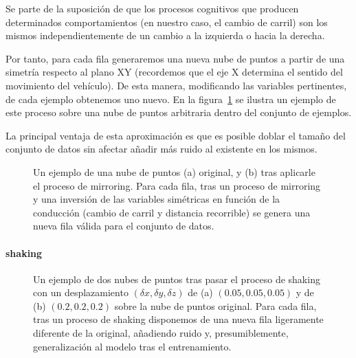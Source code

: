 Se parte de la suposición de que los procesos cognitivos que producen determinados comportamientos (en nuestro caso, el cambio de carril) son los mismos independientemente de un cambio a la izquierda o hacia la derecha.

Por tanto, para cada fila generaremos una nueva nube de puntos a partir de una simetría respecto al plano XY (recordemos que el eje X determina el sentido del movimiento del vehículo). De esta manera, modificando las variables pertinentes, de cada ejemplo obtenemos uno nuevo. En la figura~\ref{fig:mirroring-example} se ilustra un ejemplo de este proceso sobre una nube de puntos arbitraria dentro del conjunto de ejemplos.

La principal ventaja de esta aproximación es que es posible doblar el tamaño del conjunto de datos sin afectar añadir más ruido al existente en los mismos.

\begin{figure}[t]
	\centering
	\qquad
	\caption[Ejemplo de la técnica de \textit{mirroring}]{Un ejemplo de una nube de puntos (a) original, y (b) tras aplicarle el proceso de mirroring. Para cada fila, tras un proceso de mirroring y una inversión de las variables simétricas en función de la conducción (cambio de carril y distancia recorrible) se genera una nueva fila válida para el conjunto de datos.}
	\label{fig:mirroring-example}
\end{figure}

\paragraph{shaking}

\begin{figure}[b]
	\centering
	\qquad
	\caption[Ejemplo de la técnica de \textit{shaking}]{Un ejemplo de dos nubes de puntos tras pasar el proceso de shaking con un desplazamiento $(\delta x, \delta y, \delta z)$ de (a) $(0.05, 0.05, 0.05)$ y de (b) $(0.2, 0.2, 0.2)$ sobre la nube de puntos original. Para cada fila, tras un proceso de shaking disponemos de una nueva fila ligeramente diferente de la original, añadiendo ruido y, presumiblemente, generalización al modelo tras el entrenamiento.}
	\label{fig:shaking-example}
\end{figure}

